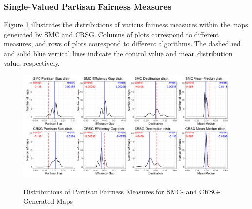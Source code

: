\subsubsection{Single-Valued Partisan Fairness Measures}

Figure \ref{fig:fair.density} illustrates the distributions of various fairness measures within the maps generated by SMC and CRSG. Columns of plots correspond to different measures, and rows of plots correspond to different algorithms. The dashed red and solid blue vertical lines indicate the control value and mean distribution value, respectively. 

\begin{landscape}
    \begin{figure}[h]
        \caption{Distributions of Partisan Fairness Measures for \hyperref[sec:smc]{SMC}- and \hyperref[sec:crsg]{CRSG}-Generated Maps}
        \includegraphics{img/fair.density.png}
        \label{fig:fair.density}
        \raggedright
    \end{figure}
\end{landscape}